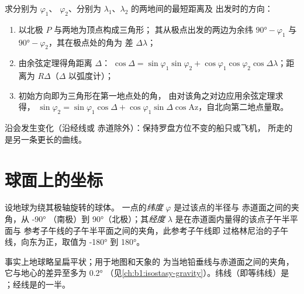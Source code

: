 \begin{method}[球面上的距离与方位]\label{met:b1:spherical-astronomy:great-circle}
求分别为 $\varphi_1$、
$\varphi_2$、分别为 $\lambda_1$、$\lambda_2$ 的两地间的最短距离及
出发时的方向：
\begin{enumerate}
  \item 以北极 $P$ 与两地为顶点构成三角形；
        其从极点出发的两边为余纬 $\ang{90} -
        \varphi_1$ 与 $\ang{90} - \varphi_2$，其在极点处的角为
        差 $\Delta\lambda$；
  \item 由余弦定理得角距离 $\Delta$：
        $\cos\Delta = \sin\varphi_1\sin\varphi_2 +
        \cos\varphi_1\cos\varphi_2\cos\Delta\lambda$；距离为
        $R\Delta$（$\Delta$ 以弧度计）；
  \item 初始方向即为三角形在第一地点处的角，
        由对该角之对边应用余弦定理求得，
        $\sin\varphi_2 = \sin\varphi_1\cos\Delta + \cos\varphi_1\sin\Delta\cos
        \mathrm{Az}$，自北向第二地点量取。
\end{enumerate}
沿会发生变化（沿经线或
赤道除外）：保持罗盘方位不变的船只或飞机，
所走的是另一条更长的曲线。
\end{method}

\section{球面上的坐标}

\begin{definition}[纬度与经度]\label{def:b1:spherical-astronomy:geographic}
设地球为绕其极轴旋转的球体。
一点的\emph{纬度} $\varphi$ 是过该点的半径与
赤道面之间的夹角，从 \ang{-90}
（南极）到 \ang{+90}（北极）；其\emph{经度}
$\lambda$ 是在赤道面内量得的该点子午半平面与
参考子午线的子午半平面之间的夹角，此参考子午线即
过格林尼治的子午线，向东为正，取值为 \ang{-180} 到
\ang{180}。
\end{definition}

事实上地球略呈扁平状；用于地图和天象的
为当地铅垂线与赤道面之间的夹角，
它与地心的差异至多为 \ang{0.2}
（见\cref{ch:b1:isostasy-gravity}）。纬线（即等纬线）是
；经线是的一半。

